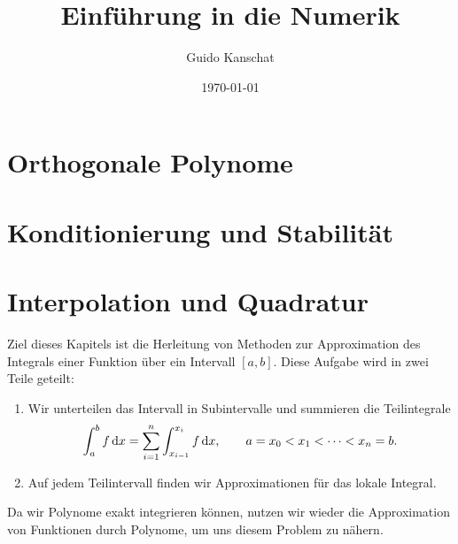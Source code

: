 \usepackage[notref,notcite]{showkeys}
\lstset{language=Python}
\usetikzlibrary{svg.path}


\def\constref#1{C_{\text{\ref{#1}}}}
\title{Einführung in die Numerik}
\author{Guido Kanschat}
\date{\today}

\newcommand{\rd}{\operatorname{rd}}
\newcommand{\eps}{\texttt{eps}}

\maketitle
\tableofcontents
\chapter{Orthogonale Polynome}


\chapter{Konditionierung und Stabilität}
\label{sec:stability}


\chapter{Interpolation und Quadratur}

\begin{intro}
  Ziel dieses Kapitels ist die Herleitung von Methoden zur
  Approximation des Integrals einer Funktion über ein Intervall
  $[a,b]$. Diese Aufgabe wird in zwei Teile geteilt:
  \begin{enumerate}
  \item Wir unterteilen das Intervall in Subintervalle und summieren
    die Teilintegrale
    \begin{gather}
      \int_a^b f \,\mathrm{d} x = \sum_{i=1}^n \int_{x_{i-1}}^{x_i} f \,\mathrm{d} x,
      \qquad
      a = x_0 < x_1 < \dots < x_n = b.
    \end{gather}
  \item Auf jedem Teilintervall finden wir Approximationen für das
    lokale Integral.
  \end{enumerate}
  Da wir Polynome exakt integrieren können, nutzen wir wieder die
  Approximation von Funktionen durch Polynome, um uns diesem Problem
  zu nähern.
\end{intro}





\printindex

